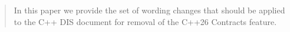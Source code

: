 \begin{abstract}
In this paper we provide the set of wording changes that should be applied to the C++ DIS document for removal of the C++26 Contracts feature.
\end{abstract}

